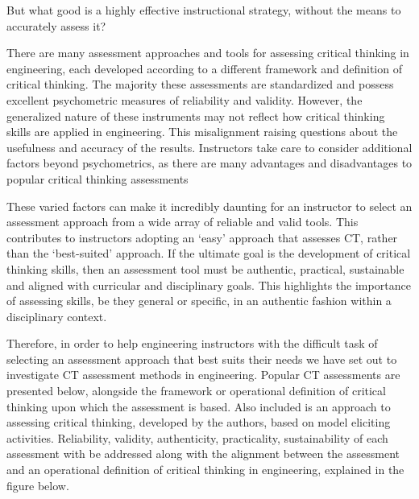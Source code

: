 But what good is a highly effective instructional strategy, without the means to accurately assess it?

There are many assessment approaches and tools for assessing critical thinking in engineering, each developed according to a different framework and definition of critical thinking.  The majority these assessments are standardized and possess excellent psychometric measures of reliability and validity.  However, the generalized nature of these instruments may not reflect how critical thinking skills are applied in engineering.  This misalignment raising questions about the usefulness and accuracy of the results.  Instructors take care to consider additional factors beyond psychometrics, as there are many advantages and disadvantages to popular critical thinking assessments\cite{Ku_2009}

These varied factors can make it incredibly daunting for an instructor to select an assessment approach from a wide array of reliable and valid tools.  This contributes to instructors adopting an ‘easy’ approach that assesses CT, rather than the ‘best-suited’ approach.  If the ultimate goal is the development of critical thinking skills, then an assessment tool must be authentic, practical, sustainable and aligned with curricular and disciplinary goals.  This highlights the importance of assessing skills, be they general or specific, in an authentic fashion within a disciplinary context.

Therefore, in order to help engineering instructors with the difficult task of selecting an assessment approach that best suits their needs we have set out to investigate CT assessment methods in engineering.  Popular CT assessments are presented below, alongside the framework or operational definition of critical thinking upon which the assessment is based.  Also included is an approach to assessing critical thinking, developed by the authors, based on model eliciting activities\cite{DiefesDux:2004fq, Kaupp:2014un}. Reliability, validity, authenticity, practicality, sustainability of each assessment with be addressed along with the alignment between the assessment and an operational definition of critical thinking in engineering, explained in the figure below.

